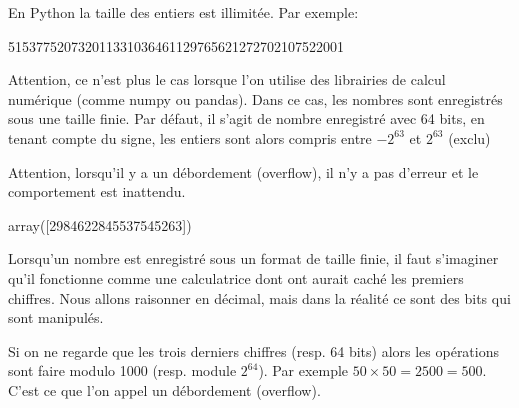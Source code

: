 \documentclass[letterpaper,10pt,english]{sphinxhowto}
\begin{document}
\sphinxAtStartPar
En Python la taille des entiers est illimitée. Par exemple:

\begin{sphinxVerbatim}[commandchars=\\\{\}]
\end{sphinxVerbatim}

\begin{sphinxVerbatim}[commandchars=\\\{\}]
515377520732011331036461129765621272702107522001
\end{sphinxVerbatim}

\sphinxAtStartPar
Attention, ce n’est plus le cas lorsque l’on utilise des librairies de calcul numérique (comme numpy ou pandas). Dans ce cas, les nombres sont enregistrés sous une taille finie. Par défaut, il s’agit de nombre enregistré avec 64 bits, en tenant compte du signe, les entiers sont alors compris entre \(-2^63\) et \(2^63\) (exclu)

\sphinxAtStartPar
Attention, lorsqu’il y a un débordement (overflow), il n’y a pas d’erreur et le comportement est inattendu.

\begin{sphinxVerbatim}[commandchars=\\\{\}]
   

  \PYG{p}{[}\PYG{p}{]}
\end{sphinxVerbatim}

\begin{sphinxVerbatim}[commandchars=\\\{\}]
array([\PYGZhy{}2984622845537545263])
\end{sphinxVerbatim}

\sphinxAtStartPar
Lorsqu’un nombre est enregistré sous un format de taille finie, il faut s’imaginer qu’il fonctionne comme une calculatrice dont ont aurait caché les premiers chiffres. Nous allons raisonner en décimal, mais dans la réalité ce sont des bits qui sont manipulés.

\sphinxAtStartPar
Si on ne regarde que les trois derniers chiffres (resp. 64 bits) alors les opérations sont faire modulo 1000 (resp. module \(2^64\)). Par exemple \(50 \times 50 = 2500 = 500\). C’est ce que l’on appel un débordement (overflow).
\end{document}
